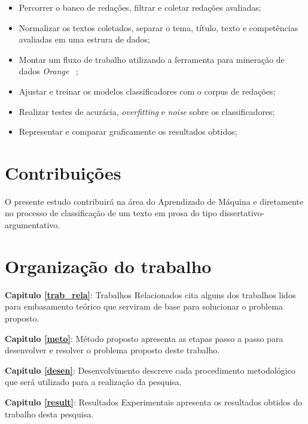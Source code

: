 \begin{itemize}
 \item Percorrer o banco de redações, filtrar e coletar redações avaliadas;
 \item Normalizar os textos coletados, separar o tema, título, texto e competências avaliadas em uma estrura de dados;
 \item Montar um fluxo de trabalho utilizando a ferramenta para mineração de dados \textit{Orange} ~\cite{JMLR:demsar13a};
 \item Ajustar e treinar os modelos classificadores com o corpus de redações; 
 \item Realizar testes de acurácia, \textit{overfitting} e \textit{noise} sobre os classificadores;
 \item Representar e comparar graficamente os resultados obtidos;
\end{itemize}

\section{Contribuições}

O presente estudo contribuirá na área do Aprendizado de Máquina e diretamente no processo de classificação de um texto em prosa do tipo dissertativo-argumentativo.

\section{Organização do trabalho}

\noindent \textbf{Capitulo \ref{trab_rela}}: Trabalhos Relacionados cita alguns dos trabalhos lidos para  embasamento teórico que serviram de base para solucionar o problema proposto.

\noindent \textbf{Capitulo \ref{meto}}: Método proposto apresenta as etapas passo a passo para desenvolver e resolver o problema proposto deste trabalho.

\noindent \textbf{Capitulo \ref{desen}}: Desenvolvimento descreve cada procedimento metodológico que será
utilizado para a realização da pesquisa.

\noindent \textbf{Capitulo \ref{result}}: Resultados Experimentais apresenta os resultados obtidos do trabalho desta pesquisa.